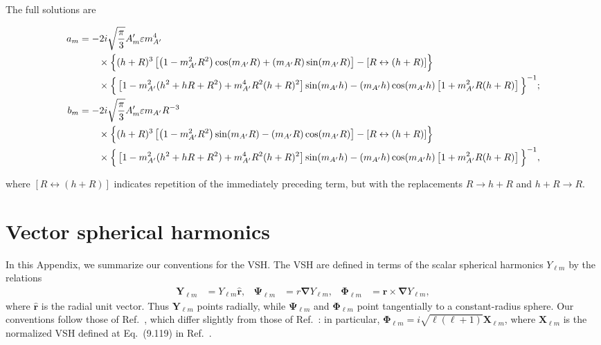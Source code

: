 \documentclass[amsmath,amssymb,aps,10pt,prd,letterpaper,nofootinbib,balancelastpage,notitlepage,superscriptaddress,twocolumn,floatfix]{revtex4-2}
\newcommand{\citeR}[2][]{Ref{#1}.~\cite{#2}}		%
\newcommand{\lb}{\ensuremath{\left}}					%
\newcommand{\rb}{\ensuremath{\right}}					%
\newcommand{\nl}{\nonumber \\ & \quad }					%
\newcommand{\rhat}{\bm{\hat{r}}}
\begin{document}
The full solutions are
\begin{widetext}
\begin{align}
a_m &= 
-2 i \sqrt{\frac{\pi}{3}} A_m' \varepsilon m_{A'}^4  \nl
   \quad \times 
   \Big\{
        (h+R)^3 \lb[ 
                    \left(1-m_{A'}^2 R^2\right) \cos (m_{A'} R)+ (m_{A'} R) \sin(m_{A'} R) 
                \rb] 
        - [ R \leftrightarrow (h+R) ]
   \Big\} \nl 
   \quad \times 
   \Big\{ 
        \left[ 1 - m_{A'}^2 ( h^2 + hR + R^2 ) + m_{A'}^4 R^2 ( h+R )^2 \right] \sin (m_{A'} h) 
        - (m_{A'} h)\cos (m_{A'}h) \left[1 + m_{A'}^2 R (h+R)\right]  
    \Big\}^{-1};
%
\label{eq:amFull} \\
b_m & = -2 i \sqrt{\frac{\pi }{3}} A_m' \varepsilon m_{A'} R^{-3} \nl
    \quad \times \Big\{
   (h+R)^3 \left[ \left(1-m_{A'}^2 R^2\right) \sin (m_{A'}
   R)- (m_{A'} R) \cos (m_{A'} R)\right] - [ R \leftrightarrow (h+R) ] 
   \Big\} \nl 
   \quad \times \Big\{ \left[ 1 - m_{A'}^2 ( h^2 + hR + R^2 ) + m_{A'}^4 R^2 ( h+R )^2 \right] \sin (m_{A'} h) - (m_{A'} h)\cos (m_{A'}h)
   \left[1 + m_{A'}^2 R (h+R)\right]  \Big\}^{-1},
%
\label{eq:bmFull}
\end{align}
\end{widetext}
where $[ R \leftrightarrow (h+R) ]$ indicates repetition of the immediately preceding term, but with the replacements $R \rightarrow h+R$ and $h+R \rightarrow R$.


\section{Vector spherical harmonics}
\label{app:vectorSphericalHarmonics}
\allowdisplaybreaks

In this Appendix, we summarize our conventions for the VSH.
The VSH are defined in terms of the scalar spherical harmonics $Y_{\ell m}$ by the relations
\begin{align}\label{eq:VSHdef}
    \bm{Y}_{\ell m} &= Y_{\ell m}\rhat, &
    \bm{\Psi}_{\ell m} &= r\bm{\nabla} Y_{\ell m}, &
    \bm{\Phi}_{\ell m} &= \bm{r}\times\bm{\nabla} Y_{\ell m},
\end{align}
where $\rhat$ is the radial unit vector.
Thus $\bm{Y}_{\ell m}$ points radially, while $\bm{\Psi}_{\ell m}$ and $\bm{\Phi}_{\ell m}$ point tangentially to a constant-radius sphere.
Our conventions follow those of \citeR{Barrera_1985}, which differ slightly from those of \citeR{Jackson}: in particular, $\bm{\Phi}_{\ell m} = i\sqrt{\ell (\ell +1)}\bm{X}_{\ell m}$, where $\bm{X}_{\ell m}$ is the normalized VSH defined at Eq.~(9.119) in \citeR{Jackson}.
\end{document}
